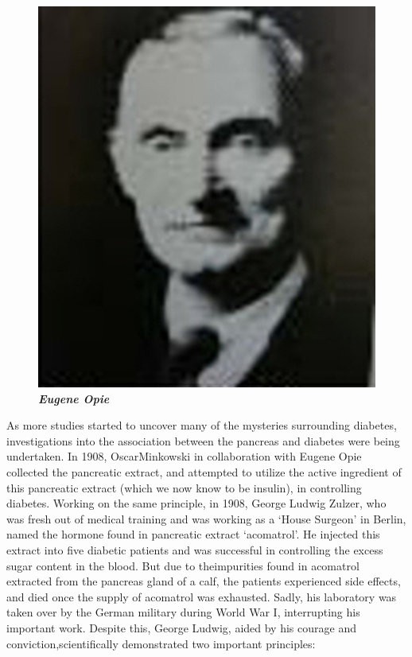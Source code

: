 \begin{figure}
\centering
\includegraphics[scale=.7]{images/010.jpg}\\
\textbf{\textit{Eugene Opie}}
\end{figure}

As more studies started to un\-cover many of the mysteries surrounding dia\-betes, investigations into the association between the pancreas and diabetes were being undertaken. In 1908, Oscar\break Minkowski in collaboration with Eugene Opie collected the pancreatic extract, and attempted to utilize the active ingredient of this pancreatic extract (which we now know to be insulin), in controlling diabetes. Working on the same principle, in 1908, George Ludwig Zulzer, who was fresh out of medical training and was working as a ‘House Surgeon’ in Berlin, named the hormone found in pancreatic extract ‘acomatrol’. He inje\-cted this extract into five diabetic patients and was successful in controlling the excess sugar content in the blood. But due to the\break impurities found in acomatrol extracted from the pancreas gland of a calf, the patients experienced side effects, and died once the supply of acomatrol was exhausted. Sadly, his laboratory was taken over by the German military during World War I, interrupting his important work. Despite this, George Ludwig, aided by his courage and conviction,\break scientifically demonstrated two important principles:

